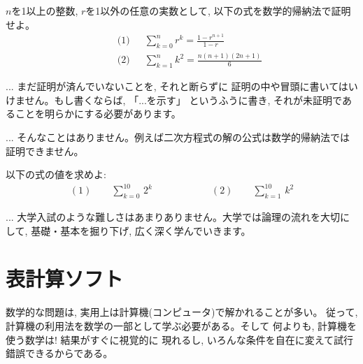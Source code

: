\begin{q}\label{q:alg_series_sum1}
 $n$を1以上の整数, $r$を1以外の任意の実数として, 以下の式を数学的帰納法で証明せよ。
\begin{eqnarray}
&&\text{(1) }\,\,\,\,\,\,\,\sum_{k=0}^n r^k=\frac{1-r^{n+1}}{1-r}\label{eq:sum_touhi}\\
&&\text{(2) }\,\,\,\,\,\,\,\sum_{k=1}^n k^2 = \frac{n(n+1)(2n+1)}{6}\label{eq:sum_xsquare}
\end{eqnarray}
\end{q}

\begin{freqmiss}{\small{}... まだ証明が済んでいないことを, それと断らずに
証明の中や冒頭に書いてはいけません。もし書くならば, 「...を示す」
というふうに書き, それが未証明であることを明らかにする必要があります。}\end{freqmiss}

\begin{faq}{\small {}
... そんなことはありません。例えば二次方程式の解の公式は数学的帰納法では証明できません。
}\end{faq}

\begin{q}\label{q:alg_sum2} 以下の式の値を求めよ:
\begin{eqnarray*}
(1) \quad\quad\sum_{k=0}^{10}\, 2^k\quad\quad\quad\quad\quad\quad
(2) \quad\quad\sum_{k=1}^{10}\, k^2
\end{eqnarray*}
\end{q}

\begin{faq}\small{
... 大学入試のような難しさはあまりありません。大学では論理の流れを大切に
して, 基礎・基本を掘り下げ, 広く深く学んでいきます。}\end{faq}
\hv



\section{表計算ソフト}

数学的な問題は, 実用上は計算機(コンピュータ)で解かれることが多い。
従って, 計算機の利用法を数学の一部として学ぶ必要がある。そして
何よりも, 計算機を使う数学は! 結果がすぐに視覚的に
現れるし, いろんな条件を自在に変えて試行錯誤できるからである。

